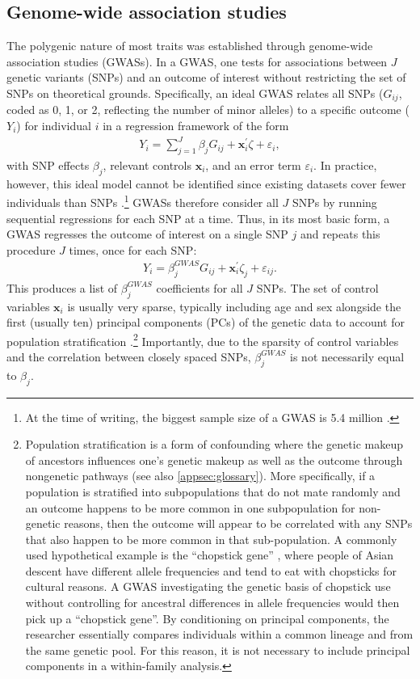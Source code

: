 \documentclass[12pt,a4paper]{article}
\begin{document}
\begin{bibunit}
\subsection{Genome-wide association studies}
\label{appsec:gwas}
The polygenic nature of most traits was established through genome-wide association studies (GWASs). In a GWAS, one tests for associations between $J$ genetic variants (SNPs) and an outcome of interest without restricting the set of SNPs on theoretical grounds. Specifically, an ideal GWAS relates all SNPs ($G_{ij}$, coded as 0, 1, or 2, reflecting the number of minor alleles) to a specific outcome ($Y_i$) for individual $i$ in a regression framework of the form
\begin{eqnarray}
Y_i = \sum_{j=1}^{J} \beta_j G_{ij} + \mathbf{x}_i^{'} \zeta + \varepsilon_i,
\label{eq:gwas}
\end{eqnarray}
with SNP effects $\beta_j$, relevant controls $\mathbf{x}_i$, and an error term $\varepsilon_i$. In practice, however, this ideal model cannot be identified since existing datasets cover fewer individuals than SNPs \citep{Benjamin2011}.\footnote{At the time of writing, the biggest sample size of a GWAS is 5.4 million \citep{Yengo2022}.} 
GWASs therefore consider all $J$ SNPs by running sequential regressions for each SNP at a time. Thus, in its most basic form, a GWAS regresses the outcome of interest on a single SNP $j$ and repeats this procedure $J$ times, once for each SNP: 
\begin{eqnarray}
Y_i = \beta_j^{GWAS} G_{ij} + \mathbf{x}_i^{'} \zeta_j + \varepsilon_{ij}.
\label{eq:gwas2}
\end{eqnarray}
This produces a list of $\beta_j^{GWAS}$ coefficients for all $J$ SNPs. The set of control variables $\mathbf{x}_i$ is usually very sparse, typically including age and sex alongside the first (usually ten) principal components (PCs) of the genetic data to account for population stratification \citep{Price2006}.\footnote{\label{fn:popstrat} Population stratification is a form of confounding where the genetic makeup of ancestors influences one's genetic makeup as well as the outcome through nongenetic pathways (see also \autoref{appsec:glossary}). More specifically, if a population is stratified into subpopulations that do not mate randomly and an outcome happens to be more common in one subpopulation for non-genetic reasons, then the outcome will appear to be correlated with any SNPs that also happen to be more common in that sub-population. A commonly used hypothetical example is the ``chopstick gene'' \citep{hamer2000beware}, where people of Asian descent have different allele frequencies and tend to eat with chopsticks for cultural reasons. A GWAS investigating the genetic basis of chopstick use without controlling for ancestral differences in allele frequencies would then pick up a ``chopstick gene''. By conditioning on principal components, the researcher essentially compares individuals within a common lineage and from the same genetic pool. For this reason, it is not necessary to include principal components in a within-family analysis.} Importantly, due to the sparsity of control variables and the correlation between closely spaced SNPs, $\beta_j^{GWAS}$ is not necessarily equal to $\beta_j$.


\end{bibunit}
\end{document}
